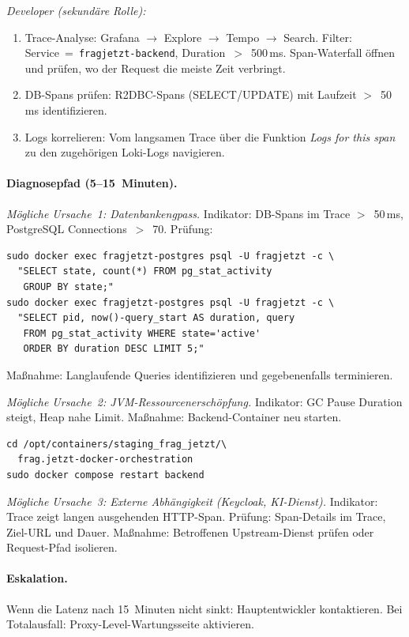 \emph{Developer (sekundäre Rolle):}
\begin{enumerate}
  \item Trace-Analyse: Grafana $\rightarrow$ Explore $\rightarrow$ Tempo $\rightarrow$ Search. Filter: Service~=~\texttt{fragjetzt-backend}, Duration~$>$~500\,ms. Span-Waterfall öffnen und prüfen, wo der Request die meiste Zeit verbringt.
  \item DB-Spans prüfen: R2DBC-Spans (SELECT/UPDATE) mit Laufzeit $>$~50\,ms identifizieren.
  \item Logs korrelieren: Vom langsamen Trace über die Funktion \emph{Logs for this span} zu den zugehörigen Loki-Logs navigieren.
\end{enumerate}

\paragraph{Diagnosepfad (5--15~Minuten).}

\emph{Mögliche Ursache~1: Datenbankengpass.} Indikator: DB-Spans im Trace $>$~50\,ms, PostgreSQL Connections~$>$~70. Prüfung:
\begin{lstlisting}[style=bashstyle]
sudo docker exec fragjetzt-postgres psql -U fragjetzt -c \
  "SELECT state, count(*) FROM pg_stat_activity
   GROUP BY state;"
sudo docker exec fragjetzt-postgres psql -U fragjetzt -c \
  "SELECT pid, now()-query_start AS duration, query
   FROM pg_stat_activity WHERE state='active'
   ORDER BY duration DESC LIMIT 5;"
\end{lstlisting}
Maßnahme: Langlaufende Queries identifizieren und gegebenenfalls terminieren.

\emph{Mögliche Ursache~2: JVM-Ressourcenerschöpfung.} Indikator: GC Pause Duration steigt, Heap nahe Limit. Maßnahme: Backend-Container neu starten.
\begin{lstlisting}[style=bashstyle]
cd /opt/containers/staging_frag_jetzt/\
  frag.jetzt-docker-orchestration
sudo docker compose restart backend
\end{lstlisting}

\emph{Mögliche Ursache~3: Externe Abhängigkeit (Keycloak, KI-Dienst).} Indikator: Trace zeigt langen ausgehenden HTTP-Span. Prüfung: Span-Details im Trace, Ziel-URL und Dauer. Maßnahme: Betroffenen Upstream-Dienst prüfen oder Request-Pfad isolieren.

\paragraph{Eskalation.}
Wenn die Latenz nach 15~Minuten nicht sinkt: Hauptentwickler kontaktieren. Bei Totalausfall: Proxy-Level-Wartungsseite aktivieren.

